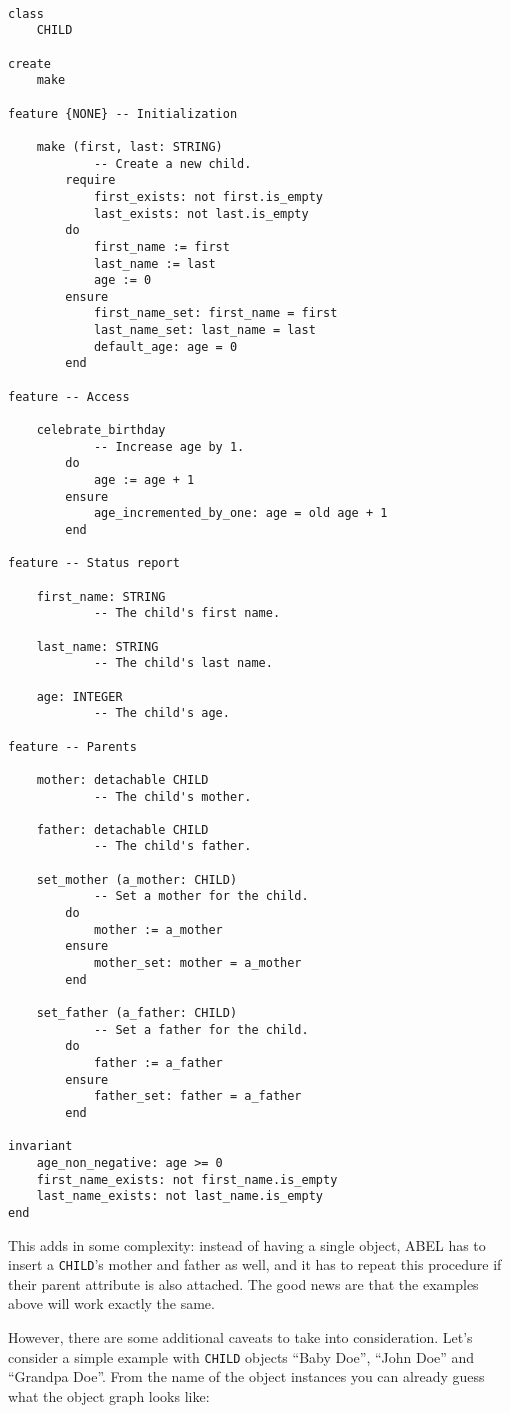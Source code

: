 \documentclass[a4paper,12pt]{report}
\begin{document}
\begin{lstlisting}[language=OOSC2Eiffel, captionpos=b, caption={The CHILD class.}, label={lst:child_class}]

class
	CHILD

create
	make

feature {NONE} -- Initialization

	make (first, last: STRING)
			-- Create a new child.
		require
			first_exists: not first.is_empty
			last_exists: not last.is_empty
		do
			first_name := first
			last_name := last
			age := 0
		ensure
			first_name_set: first_name = first
			last_name_set: last_name = last
			default_age: age = 0
		end

feature -- Access

	celebrate_birthday
			-- Increase age by 1.
		do
			age := age + 1
		ensure
			age_incremented_by_one: age = old age + 1
		end

feature -- Status report

	first_name: STRING
			-- The child's first name.

	last_name: STRING
			-- The child's last name.

	age: INTEGER
			-- The child's age.

feature -- Parents

	mother: detachable CHILD
			-- The child's mother.

	father: detachable CHILD
			-- The child's father.

	set_mother (a_mother: CHILD)
			-- Set a mother for the child.
		do
			mother := a_mother
		ensure
			mother_set: mother = a_mother
		end

	set_father (a_father: CHILD)
			-- Set a father for the child.
		do
			father := a_father
		ensure
			father_set: father = a_father
		end

invariant
	age_non_negative: age >= 0
	first_name_exists: not first_name.is_empty
	last_name_exists: not last_name.is_empty
end

\end{lstlisting}


This adds in some complexity: instead of having a single object, ABEL has to insert a \lstinline!CHILD!'s mother and father as well, and it has to repeat this procedure if their parent attribute is also attached. The good news are that the examples above will work exactly the same.

However, there are some additional caveats to take into consideration. 
Let's consider a simple example with \lstinline!CHILD! objects ``Baby Doe'', ``John Doe'' and ``Grandpa Doe''.
From the name of the object instances you can already guess what the object graph looks like: 
\end{document}
